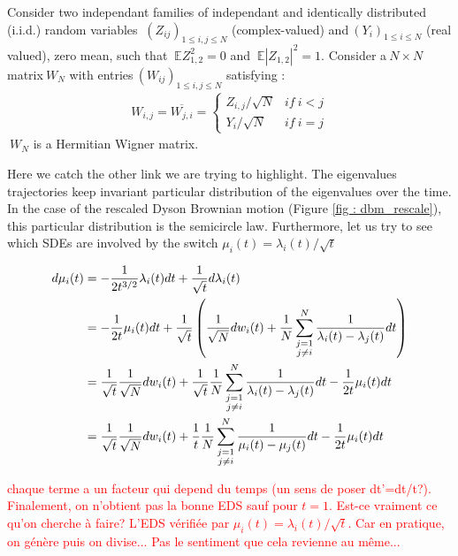 	\begin{definition}\label{def : wigner matrices}
		Consider two independant families of independant and identically distributed (i.i.d.) random variables  $\ (Z_{ij})_{1\leq i,j\leq N}$ (complex-valued) and$\ (Y_{i})_{1\leq i\leq N}$ (real valued), zero mean, such that $\ \mathbb{E}Z_{1,2}^2=0$ and $\ \mathbb{E}|Z_{1,2}|^2=1$.
		Consider a$\ N\times N$ matrix$\ W_N$ with entries$\ (W_{ij})_{1\leq i,j\leq N}$ satisfying :
		\begin{align}
			W_{i,j}=\overline{W_{j,i}} =\left\{
	    					\begin{array}{ll}
	        					Z_{i,j}/\sqrt{N} & if\ i<j  \\
	        					Y_i/\sqrt{N} & if\ i=j
	    					\end{array}\right.
		\end{align}
		$\ W_N$ is a Hermitian Wigner matrix.
	\end{definition}

Here we catch the other link we are trying to highlight. The eigenvalues trajectories keep invariant particular distribution of the eigenvalues over the time. In the case of the rescaled Dyson Brownian motion (Figure \ref{fig : dbm_rescale}), this particular distribution is the semicircle law. Furthermore, let us try to see which SDEs are involved by the switch $\mu_i(t)=\lambda_i(t)/\sqrt{t}$

		\begin{align}
			d\mu_i(t)&=-\frac{1}{2t^{3/2}}\lambda_i(t)dt+\frac{1}{\sqrt{t}}d\lambda_i(t)\notag \\
			&=-\frac{1}{2t}\mu_i(t)dt+\frac{1}{\sqrt{t}}\left(\frac{1}{\sqrt{N}}dw_i(t) + \frac{1}{N}\sum_{\substack{j=1 \\ j \neq i}}^N\frac{1}{\lambda_i(t)-\lambda_j(t)}dt\right)\notag \\
			&=\frac{1}{\sqrt{t}}\frac{1}{\sqrt{N}}dw_i(t)+\frac{1}{\sqrt{t}}\frac{1}{N}\sum_{\substack{j=1 \\ j \neq i}}^N\frac{1}{\lambda_i(t)-\lambda_j(t)}dt-\frac{1}{2t}\mu_i(t)dt \notag \\
			&=\frac{1}{\sqrt{t}}\frac{1}{\sqrt{N}}dw_i(t)+\frac{1}{t}\frac{1}{N}\sum_{\substack{j=1 \\ j \neq i}}^N\frac{1}{\mu_i(t)-\mu_j(t)}dt-\frac{1}{2t}\mu_i(t)dt \notag
		\end{align}
		\begin{remark}\label{rem: time changing}
		\textcolor{red}{chaque terme a un facteur qui depend du temps (un sens de poser dt'=dt/t?). Finalement, on n'obtient pas la bonne EDS sauf pour $t=1$. Est-ce vraiment ce qu'on cherche à faire? L'EDS vérifiée par $\mu_i(t)=\lambda_i(t)/\sqrt{t}$. Car en pratique, on génère puis on divise... Pas le sentiment que cela revienne au même...}
		\end{remark}

